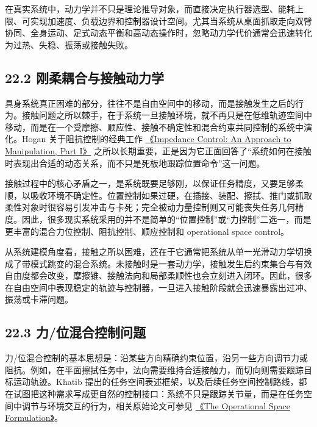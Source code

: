 在真实系统中，动力学并不只是理论推导对象，而直接决定执行器选型、能耗上限、可实现加速度、负载边界和控制器设计空间。尤其当系统从桌面抓取走向双臂协同、全身运动、足式动态平衡和高动态操作时，忽略动力学代价通常会迅速转化为过热、失稳、振荡或接触失败。

\subsection*{22.2 刚柔耦合与接触动力学}


具身系统真正困难的部分，往往不是自由空间中的移动，而是接触发生之后的行为。接触问题之所以棘手，在于系统一旦接触环境，就不再只是在低维轨迹空间中移动，而是在一个受摩擦、顺应性、接触不确定性和混合约束共同控制的系统中演化。Hogan 关于阻抗控制的经典工作 \href{https://locomotion.csail.mit.edu/elib.cgi?b=Hogan85b}{《Impedance Control: An Approach to Manipulation, Part I》} 之所以长期重要，正是因为它正面回答了“系统如何在接触时表现出合适的动态关系，而不只是死板地跟踪位置命令”这一问题。

接触过程中的核心矛盾之一，是系统既要足够刚，以保证任务精度，又要足够柔顺，以吸收环境不确定性。位置控制如果过硬，在插接、装配、擦拭、推门或抓取柔性对象时很容易引发冲击与卡死；完全被动力量控制则又可能丧失任务几何精度。因此，很多现实系统采用的并不是简单的“位置控制”或“力控制”二选一，而是更丰富的混合力位控制、阻抗控制、顺应控制和 operational space control。

从系统建模角度看，接触之所以困难，还在于它通常把系统从单一光滑动力学切换成了带模式跳变的混合系统。未接触时是一套动力学，接触发生后约束集合与有效自由度都会改变，摩擦锥、接触法向和局部柔顺性也会立刻进入闭环。因此，很多在自由空间中表现稳定的轨迹与控制器，一旦进入接触阶段就会迅速暴露出过冲、振荡或卡滞问题。

\subsection*{22.3 力/位混合控制问题}


力/位混合控制的基本思想是：沿某些方向精确约束位置，沿另一些方向调节力或阻抗。例如，在平面擦拭任务中，法向需要维持合适接触力，而切向则需要跟踪目标运动轨迹。Khatib 提出的任务空间表述框架，以及后续任务空间控制路线，都在试图把这种需求写成更自然的控制接口：系统不只是跟踪关节量，而是在任务空间中调节与环境交互的行为，相关原始论文可参见 \href{https://khatib.stanford.edu/publications/pdfs/Khatib_1987_RA.pdf}{《The Operational Space Formulation》}。

